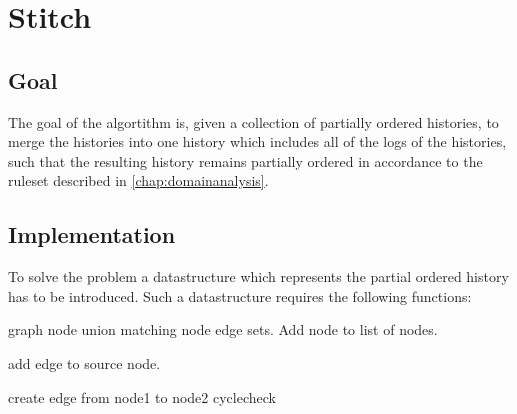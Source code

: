 \section{Stitch}
\subsection{Goal} %
The goal of the algortithm is, given a collection of partially ordered histories, to merge the histories into one history which includes all of the logs of the histories, such that the resulting history remains partially ordered in accordance to the ruleset described in \autoref{chap:domainanalysis}.


\subsection{Implementation} %
To solve the problem a datastructure which represents the partial ordered history has to be introduced. Such a datastructure requires the following functions:

\begin{algorithmic}
 {graph node}
	    \State union matching node edge sets.
	\Else
	    \State Add node to list of nodes.
	\EndIf
\EndFunction

\State\State

	\State add edge to source node.
\EndFunction

\State\State

		\State{}
	\EndFor
\EndFor
{}
				\State create edge from node1 to node2
			\EndIf
		\EndIf
	\EndFor
\EndFor
\State cyclecheck
\EndFunction
\end{algorithmic}

